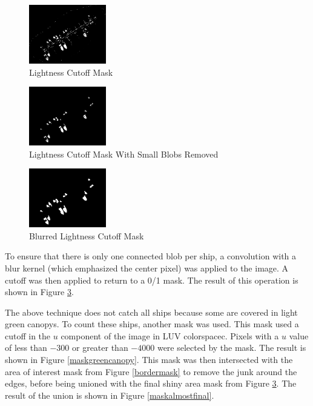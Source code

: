\documentclass[12pt]{article}
\begin{document}
\begin{figure}
\centering
\includegraphics[width=0.30\textwidth]{mask_shiny.png}
\caption{Lightness Cutoff Mask}
\label{maskshiny}
\end{figure}

\begin{figure}
\centering
\includegraphics[width=0.30\textwidth]{mask_shiny_minus_blobs.png}
\caption{Lightness Cutoff Mask With Small Blobs Removed}
\label{maskshinyminusblobs}
\end{figure}

\begin{figure}
\centering
\includegraphics[width=0.30\textwidth]{mask_shiny_minus_blobs_blurred.png}
\caption{Blurred Lightness Cutoff Mask}
\label{maskshinyminusblobsblurred}
\end{figure}

To ensure that there is only one connected blob per ship, a convolution with a blur kernel (which emphasized the center pixel) was applied to the image. A cutoff was then applied to return to a 0/1 mask. The result of this operation is shown in Figure \ref{maskshinyminusblobsblurred}.

The above technique does not catch all ships because some are covered in light green canopys. To count these ships, another mask was used. This mask used a cutoff in the \(u\) component of the image in LUV colorspacec. Pixels with a \(u\) value of less than \(-300\) or greater than \(-4000\) were selected by the mask. The result is shown in Figure \ref{maskgreencanopy}. This mask was then intersected with the area of interest mask from Figure \ref{bordermask} to remove the junk around the edges, before being unioned with the final shiny area mask from Figure \ref{maskshinyminusblobsblurred}. The result of the union is shown in Figure \ref{maskalmostfinal}.
\end{document}
